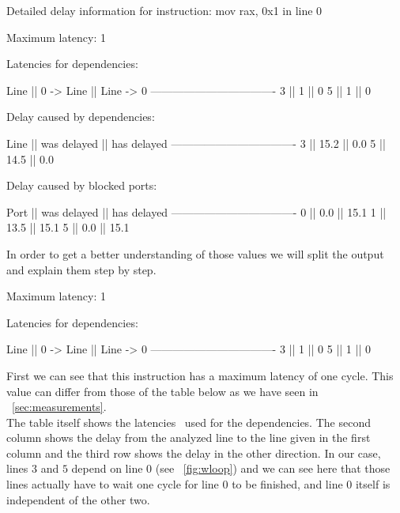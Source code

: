 \begin{Example}
Detailed delay information for instruction: mov rax, 0x1 in line 0

                Maximum latency: 1
                
                Latencies for dependencies:
                
                Line || 0 -> Line || Line -> 0
                ----------------------------------
                 3   ||     1     ||     0
                 5   ||     1     ||     0
                
                
                Delay caused by dependencies:
                
                Line || was delayed || has delayed
                ----------------------------------
                 3   ||    15.2     ||     0.0
                 5   ||    14.5     ||     0.0
                
                
                Delay caused by blocked ports:
                
                Port || was delayed || has delayed
                ----------------------------------
                 0   ||     0.0     ||    15.1
                 1   ||    13.5     ||    15.1
                 5   ||     0.0     ||    15.1
\end{Example}

In order to get a better understanding of those values we will split the output and explain them step by step.

\begin{Example}
Maximum latency: 1

Latencies for dependencies:

Line || 0 -> Line || Line -> 0
----------------------------------
 3   ||     1     ||     0
 5   ||     1     ||     0
\end{Example}

First we can see that this instruction has a maximum latency of one cycle. This value can differ from those of the table below as we have seen in ~\autoref{sec:measurements}.\\
The table itself shows the latencies \suaca\ used for the dependencies. The second column shows the delay from the analyzed line to the line given in the first column and the third row shows the delay in the other direction. In our case, lines $3$ and $5$ depend on line $0$ (see ~\autoref{fig:wloop}) and we can see here that those lines actually have to wait one cycle for line $0$ to be finished, and line $0$ itself is independent of the other two.\\

